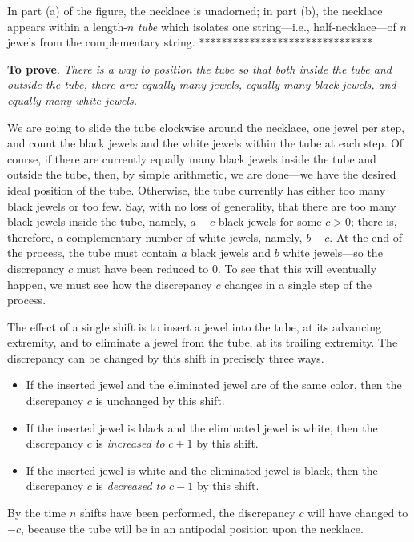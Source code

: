 \begin{itemize}
{In part (a) of the figure, the necklace is unadorned; in part (b), the necklace appears within a length-$n$ {\it tube} which isolates one string---i.e., half-necklace---of $n$ jewels from the complementary string.
*******************************}
\smallskip

{\bf To prove}.
{\em There is a way to position the tube so that both inside the tube and outside the tube, there are: equally many jewels, equally many black jewels, and equally many white jewels.} 

\medskip

We are going to slide the tube clockwise around the necklace, one jewel per step, and count the black jewels and the white jewels within the tube at each step.  Of course, if there are currently equally many black jewels inside the tube and outside the tube, then, by simple arithmetic, we are done---we have the desired ideal position of the tube.  Otherwise, the tube currently has either too many black jewels or too few.  Say, with no loss of generality, that there are too many 
black jewels inside the tube, namely, $a+c$ black jewels for some $c>0$; there is, therefore, a
complementary number of white jewels, namely, $b-c$.  At the end of the process, the tube must contain $a$ black jewels and $b$ white jewels---so the discrepancy $c$ must have been reduced to $0$.  To see that this will eventually happen, we must see how the discrepancy $c$ changes in a single step of the process.

\smallskip

The effect of a single shift is to insert a jewel into the tube, at its advancing extremity, and to eliminate a jewel from the tube, at its trailing extremity.  The discrepancy can be changed by this shift in precisely three ways.
  \begin{itemize}
  \item
If the inserted jewel and the eliminated jewel are of the same color, then the discrepancy $c$ 
is unchanged by this shift.
  \medskip\item
If the inserted jewel is black and the eliminated jewel is white, then the discrepancy $c$ is {\em increased to} $c+1$ by this shift. 
  \medskip\item
If the inserted jewel is white and the eliminated jewel is black, then the discrepancy $c$ is {\em decreased to} $c-1$ by this shift. 
  \end{itemize}
By the time $n$ shifts have been performed, the discrepancy $c$ will have changed to $-c$, because the tube will be in an antipodal position upon the necklace.


\end{itemize}
